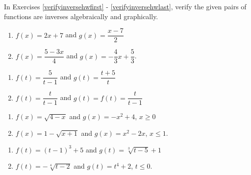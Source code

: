 \documentclass{ximera}
\begin{document}
	\author{Stitz-Zeager}


\label{ExercisesforInverseFunctions}

In Exercises \ref{verifyinversehwfirst} - \ref{verifyinversehwlast}, verify the given pairs of functions are inverses algebraically and graphically.  

\begin{multicols}{2}
\begin{enumerate}

\item $f(x) = 2x+7$ and $g(x) = \dfrac{x-7}{2}$ \label{verifyinversehwfirst}
\item $f(x) = \dfrac{5-3x}{4}$ and $g(x) = -\dfrac{4}{3} x + \dfrac{5}{3}$.


\setcounter{HW}{\value{enumi}}
\end{enumerate}
\end{multicols}


\begin{multicols}{2}
\begin{enumerate}
\setcounter{enumi}{\value{HW}}

\item $f(t) = \dfrac{5}{t-1}$ and $g(t) = \dfrac{t+5}{t}$ 
\item \label{owninverseexample} $f(t)  = \dfrac{t}{t-1}$ and $g(t) = f(t) =  \dfrac{t}{t-1}$


\setcounter{HW}{\value{enumi}}
\end{enumerate}
\end{multicols}


\begin{multicols}{2}
\begin{enumerate}
\setcounter{enumi}{\value{HW}}

\item $f(x) = \sqrt{4-x}$ and $g(x) = -x^2+4$, $x \geq 0$
\item $f(x) = 1-\sqrt{x+1}$ and $g(x) = x^2-2x$, $x \leq 1$.

\setcounter{HW}{\value{enumi}}
\end{enumerate}
\end{multicols}

\begin{multicols}{2}
\begin{enumerate}
\setcounter{enumi}{\value{HW}}

\item $f(t) = (t-1)^3+5$ and $g(t) = \sqrt[3]{t-5}+1$
\item  $f(t) = -\sqrt[4]{t-2}$ and $g(t) = t^4+2$, $t \leq 0$.  \label{verifyinversehwlast}


\setcounter{HW}{\value{enumi}}
\end{enumerate}
\end{multicols}
\end{document}
